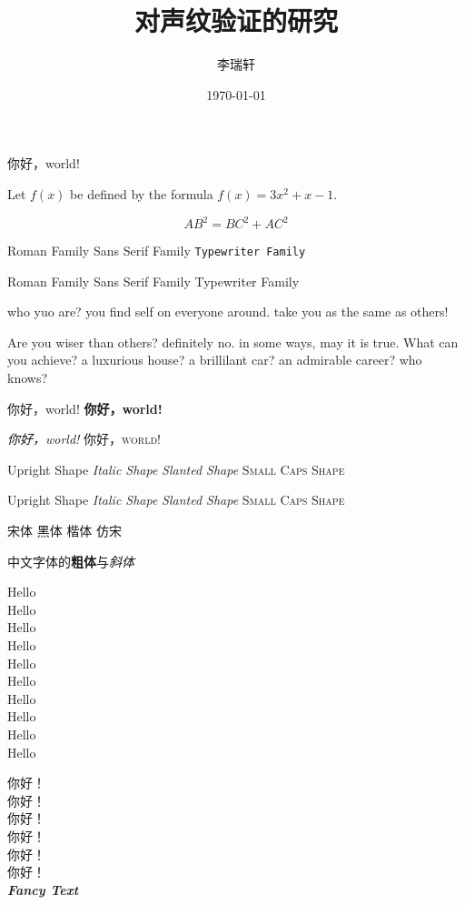 \documentclass[UTF8]{ctexart}
\title{\heiti 对声纹验证的研究}
\author{\kaishu 李瑞轩}
\date{\today}
\newcommand{\myfont}{\textit{\textbf{\textsf{Fancy Text}}}}
\begin{document}
\maketitle
你好，world!

Let $f(x)$ be defined by the formula $f(x)=3x^2+x-1$.

\begin{equation}
    AB^2=BC^2+AC^2 
\end{equation}

\textrm{Roman Family} \textsf{Sans Serif Family}
\texttt{Typewriter Family}

{\rmfamily Roman Family} {\sffamily Sans Serif Family}
{\ttfamily Typewriter Family}

{\sffamily who yuo are? you find self on everyone around. take you as the same as others!} 

{\ttfamily Are you wiser than others? definitely no. in some ways, may it is true. What can you achieve? a luxurious house? a brillilant car? an admirable career? who knows?}

\textmd{你好，world!} \textbf{你好，world!}

\textsl{你好，world!} \textsc{你好，world!}

\textup{Upright Shape} \textit{Italic Shape}
\textsl{Slanted Shape} \textsc{Small Caps Shape}

{\upshape Upright Shape} {\itshape Italic Shape} {\slshape Slanted Shape} {\scshape Small Caps Shape}

{\songti 宋体} {\heiti 黑体} {\kaishu 楷体} {\fangsong 仿宋}

中文字体的\textbf{粗体}与\textit{斜体}

{\tiny          Hello}\\
{\scriptsize    Hello}\\
{\footnotesize  Hello}\\
{\small         Hello}\\
{\normalsize    Hello}\\
{\large         Hello}\\
{\Large         Hello}\\
{\LARGE         Hello}\\
{\huge          Hello}\\
{\Huge          Hello}

 你好！\\
 你好！\\
 你好！\\
 你好！\\
 你好！\\
 你好！\\

\myfont
\end{document}
